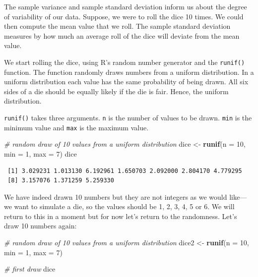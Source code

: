 \documentclass[]{article}
\newenvironment{Shaded}{\begin{snugshade}}{\end{snugshade}}
\newcommand{\CommentTok}[1]{\textcolor[rgb]{0.56,0.35,0.01}{\textit{#1}}}
\newcommand{\DataTypeTok}[1]{\textcolor[rgb]{0.13,0.29,0.53}{#1}}
\newcommand{\DecValTok}[1]{\textcolor[rgb]{0.00,0.00,0.81}{#1}}
\newcommand{\KeywordTok}[1]{\textcolor[rgb]{0.13,0.29,0.53}{\textbf{#1}}}
\newcommand{\NormalTok}[1]{#1}
\newcommand{\StringTok}[1]{\textcolor[rgb]{0.31,0.60,0.02}{#1}}
\begin{document}
The sample variance and sample standard deviation inform us about the degree of variability of our data. Suppose, we were to roll the dice 10 times. We could then compute the mean value that we roll. The sample standard deviation measures by how much an average roll of the dice will deviate from the mean value.

We start rolling the dice, using R's random number generator and the \texttt{runif()} function. The function randomly draws numbers from a uniform distribution. In a uniform distribution each value has the same probability of being drawn. All six sides of a die should be equally likely if the die is fair. Hence, the uniform distribution.

\texttt{runif()} takes three arguments. \texttt{n} is the number of values to be drawn. \texttt{min} is the minimum value and \texttt{max} is the maximum value.

\begin{Shaded}
\begin{Highlighting}[]
\CommentTok{# random draw of 10 values from a uniform distribution}
\NormalTok{dice <-}\StringTok{ }\KeywordTok{runif}\NormalTok{(}\DataTypeTok{n =} \DecValTok{10}\NormalTok{, }\DataTypeTok{min =} \DecValTok{1}\NormalTok{, }\DataTypeTok{max =} \DecValTok{7}\NormalTok{)}
\NormalTok{dice}
\end{Highlighting}
\end{Shaded}

\begin{verbatim}
 [1] 3.029231 1.013130 6.192961 1.650703 2.092000 2.804170 4.779295
 [8] 3.157076 1.371259 5.259330
\end{verbatim}

We have indeed drawn 10 numbers but they are not integers as we would like---we want to simulate a die, so the values should be 1, 2, 3, 4, 5 or 6. We will return to this in a moment but for now let's return to the randomness. Let's draw 10 numbers again:

\begin{Shaded}
\begin{Highlighting}[]
\CommentTok{# random draw of 10 values from a uniform distribution}
\NormalTok{dice2 <-}\StringTok{ }\KeywordTok{runif}\NormalTok{(}\DataTypeTok{n =} \DecValTok{10}\NormalTok{, }\DataTypeTok{min =} \DecValTok{1}\NormalTok{, }\DataTypeTok{max =} \DecValTok{7}\NormalTok{)}

\CommentTok{# first draw}
\NormalTok{dice}
\end{Highlighting}
\end{Shaded}
\end{document}
